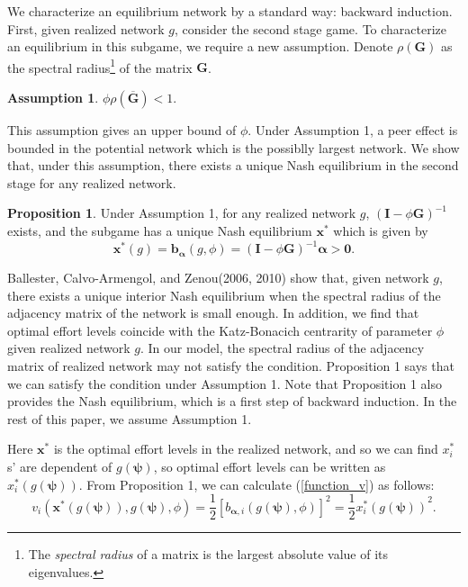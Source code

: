 \documentclass[12pt]{article}
\theoremstyle{definition}
\newtheorem{proposition}{Proposition}
\newtheorem{assumption}{Assumption}
\newcommand{\bm}[1]{\boldsymbol{#1}}
\begin{document}
We characterize an equilibrium network by a standard way: backward induction.
First, given realized network $g$, consider the second stage game.
To characterize an equilibrium in this subgame, we require a new assumption.
Denote $\rho (\bm{G})$ as the spectral radius\footnote{The {\it{spectral radius}} of a matrix is the largest absolute value of its eigenvalues.} of the matrix $\bm{G}$.

\begin{assumption}
$\phi \rho(\bm{\overline{G}}) < 1.$
\end{assumption}

This assumption gives an upper bound of $\phi$.
Under Assumption 1, a peer effect is bounded in the potential network which is the possiblly largest network.
We show that, under this assumption, there exists a unique Nash equilibrium in the second stage for any realized network.

\begin{proposition}
Under Assumption 1, for any realized network $g$, ${(\bm{I} - \phi \bm{G})}^{-1}$ exists, and the subgame has a unique Nash equilibrium $\bm{x}^*$ which is given by
\[ \bm{x}^*(g) = \bm{b}_{\bm{\alpha}}(g, \phi) = {(\bm{I} - \phi \bm{G})}^{-1} \bm{\alpha} > \bm{0}. \]
\end{proposition}

Ballester, Calvo-Armengol, and Zenou(2006, 2010) show that, given network $g$, there exists a unique interior Nash equilibrium when the spectral radius of the adjacency matrix of the network is small enough.
In addition, we find that optimal effort levels coincide with the Katz-Bonacich centrarity of parameter $\phi$ given realized network $g$.
In our model, the spectral radius of the adjacency matrix of realized network may not satisfy the condition.
Proposition 1 says that we can satisfy the condition under Assumption 1.
Note that Proposition 1 also provides the Nash equilibrium, which is a first step of backward induction.
In the rest of this paper, we assume Assumption 1.

Here $\bm{x}^*$ is the optimal effort levels in the realized network, and so we can find $x_i^*$s' are dependent of $g(\bm{\psi})$, so optimal effort levels can be written as $x_i^*(g(\bm{\psi}))$.
From Proposition 1, we can calculate (\ref{function_v}) as follows:
\begin{equation}
	\label{opteff}
	v_i(\bm{x}^*(g(\bm{\psi})), g(\bm{\psi}), \phi) = \frac{1}{2} {[b_{\bm{\alpha}, i}(g(\bm{\psi}), \phi)]}^2 = \frac{1}{2} {x_i^*(g(\bm{\psi}))}^2.
\end{equation}
\end{document}
